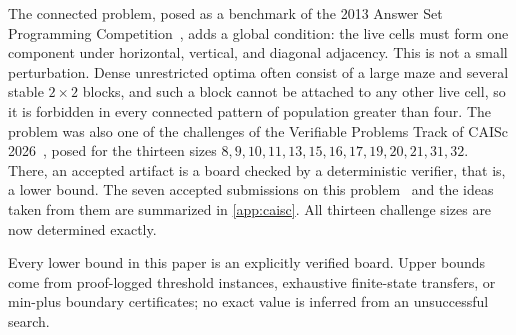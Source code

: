 \documentclass[10pt]{article}
\theoremstyle{remark}
\begin{document}
The connected problem, posed as a benchmark of the 2013 Answer Set Programming
Competition~\cite{drescher-2013}, adds a global condition: the live cells must
form one component under horizontal, vertical, and diagonal adjacency.  This
is not a small perturbation.  Dense unrestricted optima often consist of a
large maze and several stable $2\times2$ blocks, and such a block cannot be
attached to any other live cell, so it is forbidden in every connected pattern
of population greater than four.  The problem was also one of the challenges of
the Verifiable Problems Track of CAISc 2026~\cite{caisc-problem}, posed for the
thirteen sizes $8,9,10,11,13,15,16,17,19,20,21,31,32$.  There, an accepted
artifact is a board checked by a deterministic verifier, that is, a lower
bound.  The seven accepted submissions on this
problem~\cite{caisc-collier,caisc-jaswal,caisc-menta,caisc-reddy,caisc-rushdi,caisc-sodha,caisc-sridhar}
and the ideas taken from them are summarized in \cref{app:caisc}.  All thirteen
challenge sizes are now determined exactly.

Every lower bound in this paper is an explicitly verified board.  Upper bounds
come from proof-logged threshold instances, exhaustive finite-state transfers,
or min-plus boundary certificates; no exact value is inferred from an
unsuccessful search.
\end{document}
